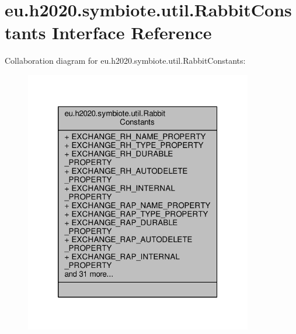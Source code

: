 \hypertarget{interfaceeu_1_1h2020_1_1symbiote_1_1util_1_1RabbitConstants}{}\section{eu.\+h2020.\+symbiote.\+util.\+Rabbit\+Constants Interface Reference}
\label{interfaceeu_1_1h2020_1_1symbiote_1_1util_1_1RabbitConstants}


Collaboration diagram for eu.\+h2020.\+symbiote.\+util.\+Rabbit\+Constants\+:\nopagebreak
\begin{figure}[H]
\begin{center}
\leavevmode
\includegraphics[width=282pt]{interfaceeu_1_1h2020_1_1symbiote_1_1util_1_1RabbitConstants__coll__graph}
\end{center}
\end{figure}
